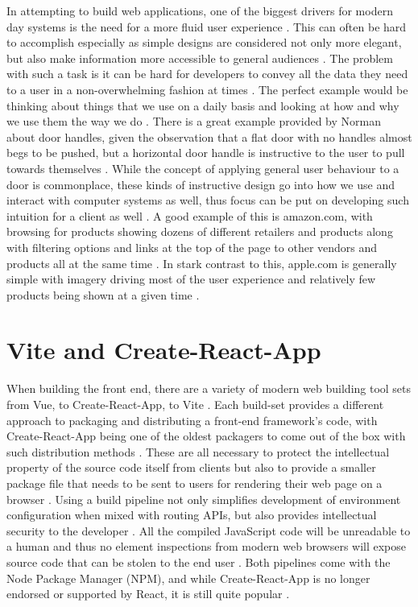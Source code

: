 In attempting to build web applications, one of the biggest drivers for modern day systems is the need for a more fluid user experience \cite{Chen_Crandall_Su_2017}. This can often be hard to accomplish especially as simple designs are considered not only more elegant, but also make information more accessible to general audiences \cite{Chen_Crandall_Su_2017}. The problem with such a task is it can be hard for developers to convey all the data they need to a user in a non-overwhelming fashion at times \cite{Norman_1988}.
\newline
\newline
The perfect example would be thinking about things that we use on a daily basis and looking at how and why we use them the way we do \cite{Norman_1988}. There is a great example provided by Norman about door handles, given the observation that a flat door with no handles almost begs to be pushed, but a horizontal door handle is instructive to the user to pull towards themselves \cite{Norman_1988}. While the concept of applying general user behaviour to a door is commonplace, these kinds of instructive design go into how we use and interact with computer systems as well, thus focus can be put on developing such intuition for a client as well \cite{Norman_1988}.
\newline
\newline
A good example of this is amazon.com, with browsing for products showing dozens of different retailers and products along with filtering options and links at the top of the page to other vendors and products all at the same time \cite{Chen_Crandall_Su_2017}. In stark contrast to this, apple.com is generally simple with imagery driving most of the user experience and relatively few products being shown at a given time \cite{Chen_Crandall_Su_2017}.

\section{Vite and Create-React-App}

When building the front end, there are a variety of modern web building tool sets from Vue, to Create-React-App, to Vite \cite{Bisiakowski}. Each build-set provides a different approach to packaging and distributing a front-end framework’s code, with Create-React-App being one of the oldest packagers to come out of the box with such distribution methods \cite{Bisiakowski}. These are all necessary to protect the intellectual property of the source code itself from clients but also to provide a smaller package file that needs to be sent to users for rendering their web page on a browser \cite{Xu_2021}.
\newline
\newline
Using a build pipeline not only simplifies development of environment configuration when mixed with routing APIs, but also provides intellectual security to the developer \cite{Bisiakowski}. All the compiled JavaScript code will be unreadable to a human and thus no element inspections from modern web browsers will expose source code that can be stolen to the end user \cite{Bisiakowski}. Both pipelines come with the Node Package Manager (NPM), and while Create-React-App is no longer endorsed or supported by React, it is still quite popular \cite{Bisiakowski}.